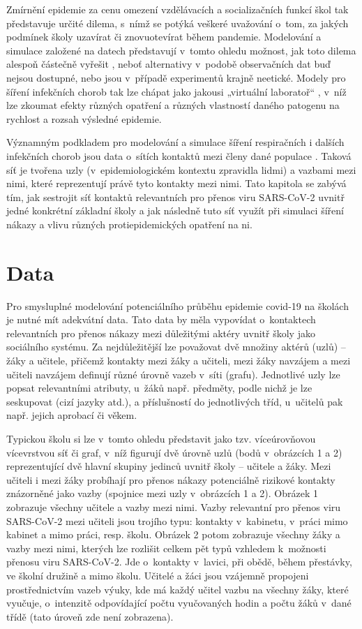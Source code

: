 Zmírnění epidemie za cenu omezení vzdělávacích a socializačních funkcí škol tak představuje určité dilema, s~nímž se potýká veškeré uvažování o~tom, za jakých podmínek školy uzavírat či znovuotevírat během pandemie. Modelování a simulace založené na datech představují v~tomto ohledu možnost, jak toto dilema alespoň částečně vyřešit \cite{squazzoni2020computational}, neboť alternativy v~podobě observačních dat buď nejsou dostupné, nebo jsou v~případě experimentů krajně neetické. Modely pro šíření infekčních chorob tak lze chápat jako jakousi „virtuální laboratoř“ \cite{Rao_etal2021}, v~níž lze zkoumat efekty různých opatření a různých vlastností daného patogenu na rychlost a rozsah výsledné epidemie.

Významným podkladem pro modelování a simulace šíření respiračních i dalších infekčních chorob jsou data o~sítích kontaktů mezi členy dané populace \cite{danon2011networks, luke2007network, zaj:mossong2008social}. Taková síť je tvořena uzly (v~epidemiologickém kontextu zpravidla lidmi) a vazbami mezi nimi, které reprezentují právě tyto kontakty mezi nimi. Tato kapitola se zabývá tím, jak sestrojit síť kontaktů relevantních pro přenos viru SARS-CoV-2 uvnitř jedné konkrétní základní školy a jak následně tuto síť využít při simulaci šíření nákazy a vlivu různých protiepidemických opatření na ni. 


\section*{Data} 
Pro smysluplné modelování potenciálního průběhu epidemie covid-19 na školách je nutné mít adekvátní data. Tato data by měla vypovídat o~kontaktech relevantních pro přenos nákazy mezi důležitými aktéry uvnitř školy jako sociálního systému. Za nejdůležitější lze považovat dvě množiny aktérů (uzlů) – žáky a učitele, přičemž kontakty mezi žáky a učiteli, mezi žáky navzájem a mezi učiteli navzájem definují různé úrovně vazeb v~síti (grafu). Jednotlivé uzly lze popsat relevantními atributy, u~žáků např. předměty, podle nichž je lze seskupovat (cizí jazyky atd.), a příslušností do jednotlivých tříd, u~učitelů pak např. jejich aprobací či věkem. 

Typickou školu si lze v~tomto ohledu představit jako tzv. víceúrovňovou ví\-ce\-vrst\-vou síť či graf, v~níž figurují dvě úrovně uzlů (bodů v~obrázcích 1 a 2) reprezentující dvě hlavní skupiny jedinců uvnitř školy – učitele a žáky. Mezi učiteli i mezi žáky probíhají pro přenos nákazy potenciálně rizikové kontakty znázorněné jako vazby (spojnice mezi uzly v~obrázcích 1 a 2). Obrázek 1 zobrazuje všechny učitele a vazby mezi nimi. Vazby relevantní pro přenos viru SARS-CoV-2 mezi učiteli jsou trojího typu: kontakty v~kabinetu, v~práci mimo kabinet a mimo práci, resp. školu. Obrázek 2 potom zobrazuje všechny žáky a vazby mezi nimi, kterých lze rozlišit celkem pět typů vzhledem k~možnosti přenosu viru SARS-CoV-2. Jde o~kontakty v~lavici, při obědě, během přestávky, ve školní družině a mimo školu. Učitelé a žáci jsou vzájemně propojeni prostřednictvím vazeb výuky, kde má každý učitel vazbu na všechny žáky, které vyučuje, o~intenzitě odpovídající počtu vyučovaných hodin a počtu žáků v~dané třídě (tato úroveň zde není zobrazena).

